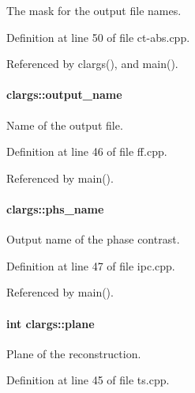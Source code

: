 The mask for the output file names. 



Definition at line 50 of file ct-\/abs.cpp.



Referenced by clargs(), and main().

\hypertarget{structclargs_a3024e9ff1fd5eaaa6eb32c8dde23f34e}{
\paragraph[{output\_\-name}]{ {\bf clargs::output\_\-name}}\hfill}
\label{structclargs_a3024e9ff1fd5eaaa6eb32c8dde23f34e}


Name of the output file. 



Definition at line 46 of file ff.cpp.



Referenced by main().

\hypertarget{structclargs_aa1aa24a8a3a78b10dd5be6aba22c2ae2}{
\paragraph[{phs\_\-name}]{ {\bf clargs::phs\_\-name}}\hfill}
\label{structclargs_aa1aa24a8a3a78b10dd5be6aba22c2ae2}


Output name of the phase contrast. 



Definition at line 47 of file ipc.cpp.



Referenced by main().

\hypertarget{structclargs_a30d78267245c9e4f21f8314f39fecf06}{
\paragraph[{plane}]{\setlength{\rightskip}{0pt plus 5cm}int {\bf clargs::plane}}\hfill}
\label{structclargs_a30d78267245c9e4f21f8314f39fecf06}


Plane of the reconstruction. 



Definition at line 45 of file ts.cpp.



